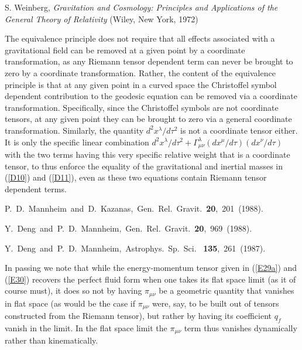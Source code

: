 \begin{thebibliography}{10}
 S. Weinberg, {\it Gravitation and Cosmology:
Principles  and Applications of the General Theory of Relativity} 
(Wiley, New York, 1972)




 The equivalence principle does not require that all effects associated with a gravitational field can be removed at a given point by a coordinate transformation, as any Riemann tensor dependent term can never be brought to zero by a coordinate transformation. Rather, the content of the equivalence principle is  that at any given point in a curved space the Christoffel symbol dependent contribution to the geodesic equation can be removed via a coordinate transformation. Specifically, since the Christoffel symbols are not coordinate tensors, at any given point they can be brought to zero via a general coordinate transformation. Similarly, the quantity $d^2x^{\lambda}/d\tau^2$ is not a coordinate tensor either. It is only the specific linear combination $d^2x^{\lambda}/d\tau^2+\Gamma^{\lambda}_{\mu\nu}(dx^{\mu}/d\tau)( dx^{\nu}/d\tau)$ with the two terms having this very specific relative weight that is a coordinate tensor, to thus enforce the equality of the gravitational and inertial masses in (\ref{D10}) and (\ref{D11}), even as these two equations contain Riemann tensor dependent terms.

 P.~D.~Mannheim~and~D.~Kazanas,~Gen.~Rel.~Gravit.~{\bf 20},~201~(1988).

 Y.~Deng~and~P.~D.~Mannheim,~Gen.~Rel.~Gravit.~{\bf 20},~969~(1988).

 Y.~Deng~and~P.~D.~Mannheim,~Astrophys.~Sp.~Sci.~ {\bf 135},~261~(1987).



 In passing we note that while the energy-momentum tensor given in (\ref{E29a}) and (\ref{E30}) recovers the perfect fluid form when one takes its flat space limit (as it of course must), it does so not by having $\pi_{\mu\nu}$ be a geometric quantity that vanishes in flat space (as would be the case if $\pi_{\mu\nu}$ were, say,  to be built out of tensors constructed from the Riemann tensor), but rather by having its coefficient $q_f$ vanish in the limit. In the flat space limit the $\pi_{\mu\nu}$ term thus vanishes dynamically rather than kinematically.



\end{thebibliography}

